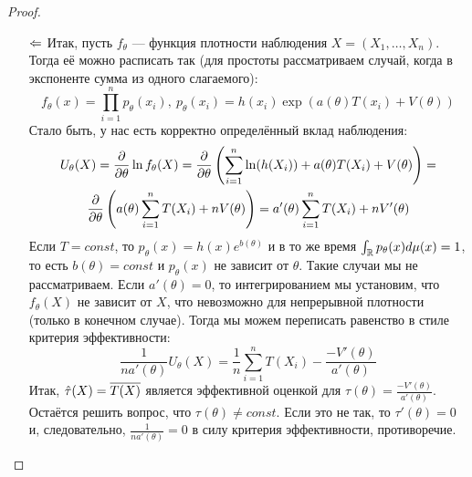 \begin{proof}~
	\begin{itemize}
		\item[$\Leftarrow$] Итак, пусть $f_\theta$ --- функция плотности наблюдения $X = (X_1, \ldots, X_n)$. Тогда её можно расписать так (для простоты рассматриваем случай, когда в экспоненте сумма из одного слагаемого):
		\[
			f_\theta(x) = \prod_{i = 1}^n p_\theta(x_i),\ p_\theta(x_i) = h(x_i)\exp(a(\theta)T(x_i) + V(\theta))
		\]
		Стало быть, у нас есть корректно определённый вклад наблюдения:
		\begin{multline*}
			U_\theta(X) = \frac{\partial }{\partial \theta} \ln f_\theta(X) = \frac{\partial }{\partial \theta} \left(\sum_{i = 1}^n \ln (h(X_i)) + a(\theta)T(X_i) + V(\theta)\right) =
			\\
			\frac{\partial }{\partial \theta} \left(a(\theta)\sum_{i = 1}^n T(X_i) + nV(\theta)\right) = a'(\theta)\sum_{i = 1}^n T(X_i) + nV'(\theta)
		\end{multline*}
		Если $T = const$, то $p_\theta(x) = h(x)e^{b(\theta)}$ и в то же время $\int_{\mathbb{R}} p_\theta(x)d\mu(x) = 1$, то есть $b(\theta) = const$ и $p_\theta(x)$ не зависит от $\theta$. Такие случаи мы не рассматриваем. Если $a'(\theta) = 0$, то интегрированием мы установим, что $f_\theta(X)$ не зависит от $X$, что невозможно для непрерывной плотности (только в конечном случае). Тогда мы можем переписать равенство в стиле критерия эффективности:
		\[
			\frac{1}{na'(\theta)}U_\theta(X) = \frac{1}{n}\sum_{i = 1}^n T(X_i) - \frac{-V'(\theta)}{a'(\theta)}
		\]
		Итак, $\hat{\tau}(X) = \overline{T(X)}$ является эффективной оценкой для $\tau(\theta) = \frac{-V'(\theta)}{a'(\theta)}$. Остаётся решить вопрос, что $\tau(\theta) \neq const$. Если это не так, то $\tau'(\theta) = 0$ и, следовательно, $\frac{1}{na'(\theta)} = 0$ в силу критерия эффективности, противоречие.
		

\end{itemize}
\end{proof}
